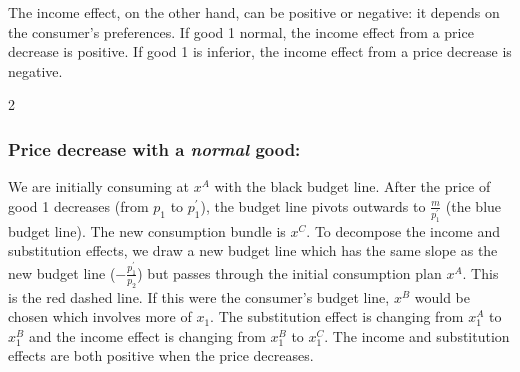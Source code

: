 \documentclass{article}
\begin{document}
  The income effect, on the other hand, can be positive or negative: it depends on the consumer's preferences. If good 1 normal, the income effect from a price decrease is positive. If good 1 is inferior, the income effect from a price decrease is negative.

\begin{multicols}{2}
\subsubsection*{Price decrease with a \emph{normal} good:}
We are initially consuming at $x^A$ with the black budget line. After the price of good 1 decreases (from $p_1$ to $p_1^\prime$), the budget line pivots outwards to $\frac{m}{p_1^\prime}$ (the blue budget line). The new consumption bundle is $x^C$. To decompose the income and substitution effects, we draw a new budget line which has the same slope as the new budget line ($-\frac{p_1^\prime}{p_2}$) but passes through the initial consumption plan $x^A$. This is the red dashed line. If this were the consumer's budget line, $x^B$ would be chosen which involves more of $x_1$. The substitution effect is changing from $x_1^A$ to $x_1^B$ and the income effect is changing from $x_1^B$ to $x_1^C$. The income and substitution effects are both positive when the price decreases.

\noindent{}
\end{multicols}
\end{document}
